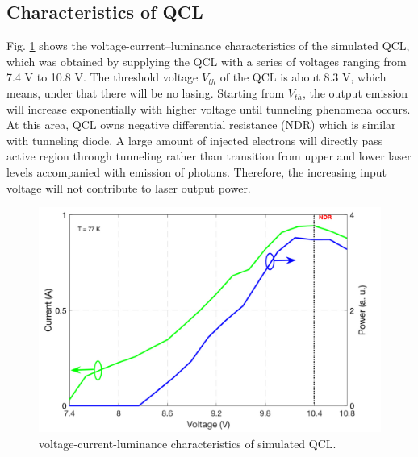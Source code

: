\documentclass[11pt,final]{scrbook}
\begin{document}
\subsection{Characteristics of QCL}
Fig. \ref{fig:IVcurve} shows the voltage-current–luminance characteristics of the simulated QCL, which was obtained by supplying the QCL with a series of voltages ranging from 7.4 V to 10.8 V. The threshold voltage $V_{th}$ of the QCL is about 8.3 V, which means, under that there will be no lasing. Starting from $V_{th}$, the output emission will increase exponentially with higher voltage until tunneling phenomena occurs. At this area, QCL owns negative differential resistance (NDR) which is similar with tunneling diode. A large amount of injected electrons will directly pass active region through tunneling rather than transition from upper and lower laser levels accompanied with emission of photons. Therefore, the increasing input voltage will not contribute to laser output power. 

\begin{figure}[htbp]
\begin{center}
\includegraphics[scale=0.6]{images/IVCURVE.pdf}
\caption{voltage-current-luminance characteristics of simulated QCL.}
\label{fig:IVcurve}
\end{center}
\end{figure}
\end{document}
